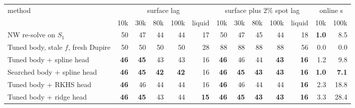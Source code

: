 \begin{tabular}{l rrrrr rrrrr rr}
\toprule
method & \multicolumn{5}{c}{surface lag} & \multicolumn{5}{c}{surface plus $2\%$ spot lag} & \multicolumn{2}{c}{online s}\\
\cmidrule(lr){2-6}\cmidrule(lr){7-11}\cmidrule(lr){12-13}
& 10k & 30k & 80k & 100k & liquid & 10k & 30k & 80k & 100k & liquid & 10k & 100k\\
\midrule
NW re-solve on $S_1$ & 50 & 47 & 44 & 44 & 17 & 50 & 47 & 45 & 44 & 18 & \textbf{1.0} & 8.5\\
Tuned body, stale $f$, fresh Dupire & 50 & 50 & 50 & 50 & 28 & 88 & 88 & 88 & 88 & 56 & 0.0 & 0.0\\
Tuned body + spline head & \textbf{46} & \textbf{45} & 43 & 43 & 16 & \textbf{46} & 46 & 44 & \textbf{43} & \textbf{16} & 1.2 & 9.8\\
Searched body + spline head & \textbf{46} & \textbf{45} & \textbf{42} & \textbf{42} & 16 & \textbf{46} & \textbf{45} & \textbf{43} & \textbf{43} & \textbf{16} & \textbf{1.0} & \textbf{7.1}\\
Tuned body + RKHS head & \textbf{46} & 46 & 44 & 44 & 16 & \textbf{46} & 46 & 44 & 44 & \textbf{16} & 2.3 & 18.8\\
Tuned body + ridge head & \textbf{46} & \textbf{45} & 43 & 44 & \textbf{15} & \textbf{46} & \textbf{45} & \textbf{43} & \textbf{43} & \textbf{16} & 3.3 & 28.4\\
\bottomrule
\end{tabular}
